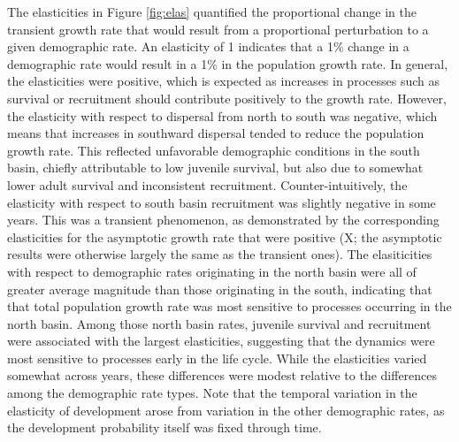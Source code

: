 The elasticities in Figure \ref{fig:elas} quantified the proportional change 
in the transient growth rate 
that would result from a proportional perturbation to a given demographic rate.
An elasticity of 1 indicates that a 1\% change in a demographic rate would result in
a 1\% in the population growth rate.
In general, the elasticities were positive,
which is expected as increases in processes such as survival or recruitment
should contribute positively to the growth rate.
However, the elasticity with respect to dispersal from north to south was negative,
which means that increases in southward dispersal 
tended to reduce the population growth rate.
This reflected unfavorable demographic conditions in the south basin,
chiefly attributable to low juvenile survival,
but also due to somewhat lower adult survival and inconsistent recruitment.
Counter-intuitively, the elasticity with respect to south basin recruitment was
slightly negative in some years. 
This was a transient phenomenon,
as demonstrated by the corresponding elasticities 
for the asymptotic growth rate that were positive
(X; the asymptotic results were otherwise largely the same as the transient ones).
The elasiticities with respect to 
demographic rates originating in the north basin were all of greater
average magnitude than those originating in the south,
indicating that that total population growth rate was most sensitive to processes
occurring in the north basin.
Among those north basin rates, juvenile survival and recruitment were associated with
the largest elasticities,
suggesting that the dynamics were most sensitive to processes early in the life cycle.
While the elasticities varied somewhat across years, 
these differences were modest relative to the differences among the demographic rate types.
Note that the temporal variation in the elasticity of development arose from
variation in the other demographic rates, 
as the development probability itself was fixed through time.

